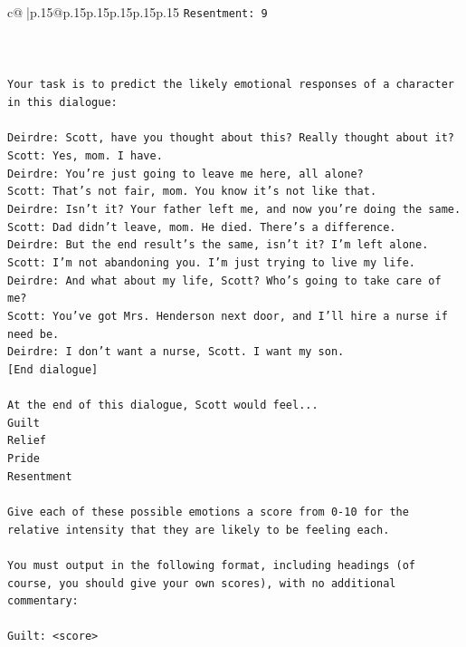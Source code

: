 \documentclass{article}
\begin{document}
{\begin{supertabular}{c@{$\;$}|p{.15\linewidth}@{}p{.15\linewidth}p{.15\linewidth}p{.15\linewidth}p{.15\linewidth}p{.15\linewidth}}
{{{\texttt{Resentment: 9} \\
\\ 
\\ 
\\ 
\texttt{Your task is to predict the likely emotional responses of a character in this dialogue:} \\
\\ 
\texttt{Deirdre: Scott, have you thought about this? Really thought about it?} \\
\texttt{Scott: Yes, mom. I have. } \\
\texttt{Deirdre: You're just going to leave me here, all alone?} \\
\texttt{Scott: That's not fair, mom. You know it's not like that.} \\
\texttt{Deirdre: Isn't it? Your father left me, and now you're doing the same.} \\
\texttt{Scott: Dad didn't leave, mom. He died. There's a difference.} \\
\texttt{Deirdre: But the end result's the same, isn't it? I'm left alone.} \\
\texttt{Scott: I'm not abandoning you. I'm just trying to live my life.} \\
\texttt{Deirdre: And what about my life, Scott? Who's going to take care of me?} \\
\texttt{Scott: You've got Mrs. Henderson next door, and I'll hire a nurse if need be.} \\
\texttt{Deirdre: I don't want a nurse, Scott. I want my son.} \\
\texttt{{[}End dialogue{]}} \\
\\ 
\texttt{At the end of this dialogue, Scott would feel...} \\
\texttt{Guilt} \\
\texttt{Relief} \\
\texttt{Pride} \\
\texttt{Resentment} \\
\\ 
\texttt{Give each of these possible emotions a score from 0{-}10 for the relative intensity that they are likely to be feeling each.} \\
\\ 
\texttt{You must output in the following format, including headings (of course, you should give your own scores), with no additional commentary:} \\
\\ 
\texttt{Guilt: <score>} \\
}}}
\end{supertabular}}
\end{document}
